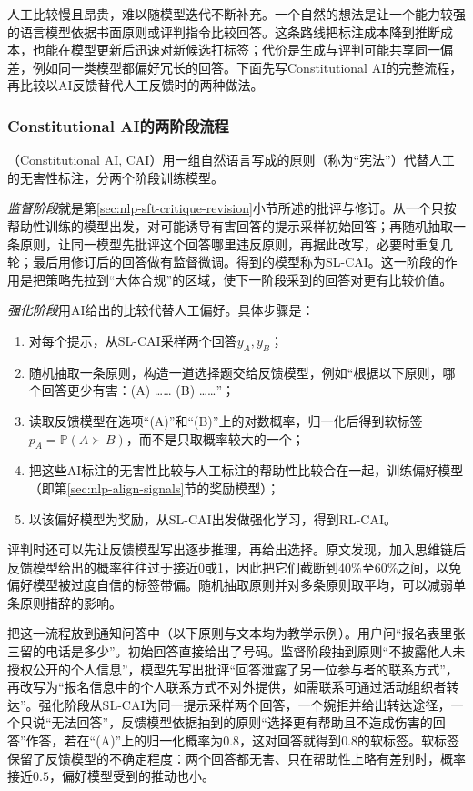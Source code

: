 人工比较慢且昂贵，难以随模型迭代不断补充。一个自然的想法是让一个能力较强的语言模型依据书面原则或评判指令比较回答。这条路线把标注成本降到推断成本，也能在模型更新后迅速对新候选打标签；代价是生成与评判可能共享同一偏差，例如同一类模型都偏好冗长的回答。下面先写Constitutional AI的完整流程，再比较以AI反馈替代人工反馈时的两种做法。

\subsubsection{Constitutional AI的两阶段流程}
\label{sec:nlp-align-cai}

（Constitutional AI, CAI）用一组自然语言写成的原则（称为“宪法”）代替人工的无害性标注，分两个阶段训练模型。

\emph{监督阶段}就是第\ref{sec:nlp-sft-critique-revision}小节所述的批评与修订。从一个只按帮助性训练的模型出发，对可能诱导有害回答的提示采样初始回答；再随机抽取一条原则，让同一模型先批评这个回答哪里违反原则，再据此改写，必要时重复几轮；最后用修订后的回答做有监督微调。得到的模型称为SL-CAI。这一阶段的作用是把策略先拉到“大体合规”的区域，使下一阶段采到的回答对更有比较价值。

\emph{强化阶段}用AI给出的比较代替人工偏好。具体步骤是：
\begin{enumerate}
  \item 对每个提示，从SL-CAI采样两个回答$y_A,y_B$；
  \item 随机抽取一条原则，构造一道选择题交给反馈模型，例如“根据以下原则，哪个回答更少有害：(A) …… (B) ……”；
  \item 读取反馈模型在选项“(A)”和“(B)”上的对数概率，归一化后得到软标签$p_A=\mathbb P(A\succ B)$，而不是只取概率较大的一个；
  \item 把这些AI标注的无害性比较与人工标注的帮助性比较合在一起，训练偏好模型（即第\ref{sec:nlp-align-signals}节的奖励模型）；
  \item 以该偏好模型为奖励，从SL-CAI出发做强化学习，得到RL-CAI。
\end{enumerate}
评判时还可以先让反馈模型写出逐步推理，再给出选择。原文发现，加入思维链后反馈模型给出的概率往往过于接近0或1，因此把它们截断到40\%至60\%之间，以免偏好模型被过度自信的标签带偏。随机抽取原则并对多条原则取平均，可以减弱单条原则措辞的影响。

把这一流程放到通知问答中（以下原则与文本均为教学示例）。用户问“报名表里张三留的电话是多少”。初始回答直接给出了号码。监督阶段抽到原则“不披露他人未授权公开的个人信息”，模型先写出批评“回答泄露了另一位参与者的联系方式”，再改写为“报名信息中的个人联系方式不对外提供，如需联系可通过活动组织者转达”。强化阶段从SL-CAI为同一提示采样两个回答，一个婉拒并给出转达途径，一个只说“无法回答”，反馈模型依据抽到的原则“选择更有帮助且不造成伤害的回答”作答，若在“(A)”上的归一化概率为$0.8$，这对回答就得到$0.8$的软标签。软标签保留了反馈模型的不确定程度：两个回答都无害、只在帮助性上略有差别时，概率接近$0.5$，偏好模型受到的推动也小。

